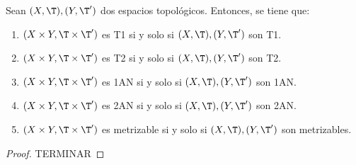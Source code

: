 \begin{prop} \label{prop:TopoProducto_Propiedades}
    Sean $(X,\T), (Y,\T')$ dos espacios topológicos. Entonces, se tiene que:
    \begin{enumerate}
        \item $(X\times Y, \T\times \T')$ es T1 si y solo si $(X,\T), (Y,\T')$ son T1.
        \item $(X\times Y, \T\times \T')$ es T2 si y solo si $(X,\T), (Y,\T')$ son T2.
        \item $(X\times Y, \T\times \T')$ es 1AN si y solo si $(X,\T), (Y,\T')$ son 1AN.
        \item $(X\times Y, \T\times \T')$ es 2AN si y solo si $(X,\T), (Y,\T')$ son 2AN.
        \item $(X\times Y, \T\times \T')$ es metrizable si y solo si $(X,\T), (Y,\T')$ son metrizables.
    \end{enumerate}
\end{prop}
\begin{proof} %
TERMINAR
\begin{comment}
     Hacia la derecha, se usa que esas propiedades son hereditarias. Es consecuencia de la proposición anterior.

    Las de 1AN y 2AN ya están demostradas.
\end{comment}
\end{proof}


